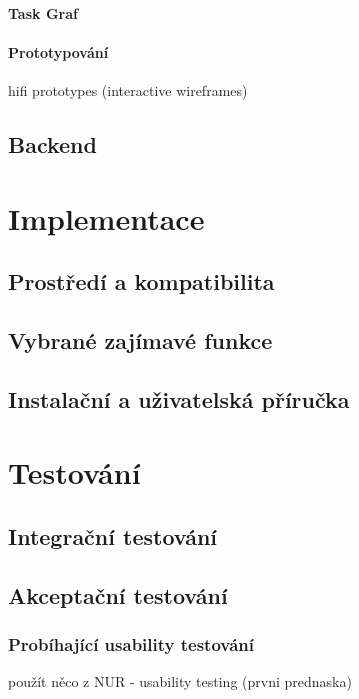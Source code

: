 \documentclass[thesis=M,czech]{FITthesis}[2012/06/26]
\begin{document}
\subsubsection{Task Graf} \label{subsubsec:navrh_frontend_ui_taskgraf}

\subsubsection{Prototypování} \label{subsubsec:navrh_frontend_ui_proto}
hifi prototypes (interactive wireframes)



\section{Backend} \label{sec:navrh_backend}




\chapter{Implementace} \label{chap:impl}
\section{Prostředí a kompatibilita} \label{sec:impl_prostredi}


\section{Vybrané zajímavé funkce} \label{sec:impl_funkce}
\section{Instalační a uživatelská příručka} \label{sec:impl_prirucka}




\chapter{Testování} \label{chap:testovani}
\section{Integrační testování} \label{sec:testovani_integracni}	
\section{Akceptační testování} \label{sec:testovani_akceptacni}
\subsection{Probíhající usability testování} \label{subsec:testovani_akceptacni_utest}
použít něco z NUR - usability testing (prvni prednaska)
\end{document}
